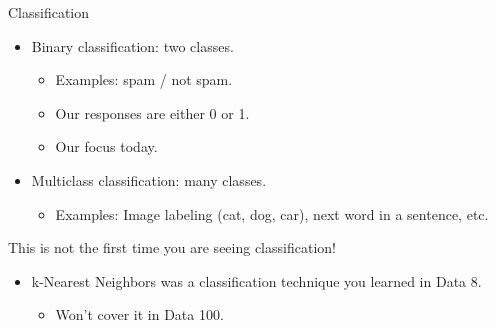 \documentclass[aspectratio=169]{../latex_main/tntbeamer}  %
\begin{document}
	
	\begin{frame}[c]{Classification}
	    \begin{itemize}
	        \item Binary classification: two classes.
	        \begin{itemize}
	            \item Examples: spam / not spam. 
	            \item Our responses are either 0 or 1.
	            \item Our focus today.
	        \end{itemize}
	        \item Multiclass classification: many classes.
	        \begin{itemize}
	            \item Examples: Image labeling (cat, dog, car), next word in a sentence, etc.
	        \end{itemize}
	    \end{itemize}
	    This is not the first time you are seeing classification!
	    \begin{itemize}
	        \item k-Nearest Neighbors was a classification technique you learned in Data 8.
	        \begin{itemize}
	            \item Won’t cover it in Data 100.
	        \end{itemize}
	    \end{itemize}
	\end{frame}
	
\end{document}
